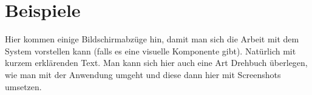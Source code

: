 \chapter{Beispiele}

Hier kommen einige Bildschirmabzüge hin, damit man sich die Arbeit mit dem System vorstellen kann (falls es eine visuelle Komponente gibt). Natürlich mit kurzem erklärenden Text. Man kann sich hier auch eine Art Drehbuch überlegen, wie man mit der Anwendung umgeht und diese dann hier mit Screenshots umsetzen.  

